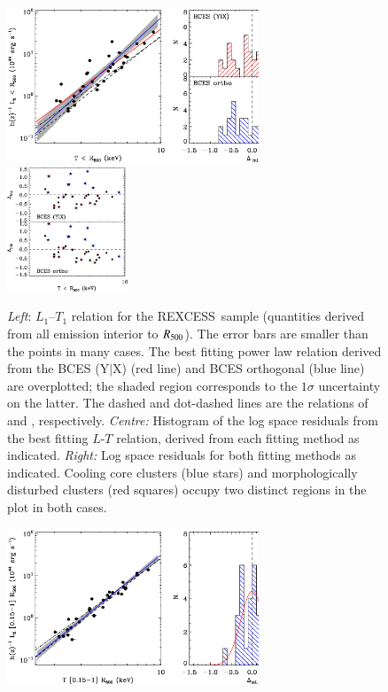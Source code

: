 \documentclass[oldversion]{aa}
\newcommand{\rexcess}{{\gwpfont REXCESS}}
\begin{document}
{%
\begin{figure}[]
\centering
\includegraphics[width=0.67\textwidth]{0944f2a.ps}
\includegraphics[width=0.32\textwidth]{0944f2b.eps}
\caption{{\footnotesize {\it Left}: $L_1$--$T_1$ relation for the
    \rexcess\ sample (quantities derived from all
    emission interior to $R_{500}$). The error bars are smaller than the
    points in many cases. The best fitting power law relation
    derived from the BCES (Y$|$X) (red line) and BCES orthogonal (blue line) are overplotted; the shaded region corresponds to the $1\sigma$ uncertainty on the latter. The dashed and dot-dashed lines are the relations of \citet{ae99} and \citet{mark98}, respectively. {\em Centre:} Histogram of the log
    space residuals from the best 
    fitting $L$-$T$ relation, derived from each fitting method as indicated. {\em Right:} Log space residuals for both fitting methods as indicated. Cooling core clusters
    (blue stars) and morphologically disturbed clusters (red squares)
    occupy two distinct regions in the plot in both cases.}}\label{fig:LxTraw} 
   \end{figure}
\begin{figure}[]
\centering
\includegraphics[width=0.67\textwidth]{0944f3a.ps}

\end{figure}}
\end{document}
